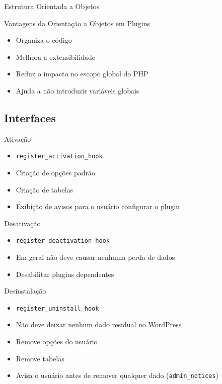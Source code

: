 \documentclass{beamer}
\begin{document}
\begin{frame}{Estrutura Orientada a Objetos}
  \pause 
\end{frame}

\begin{frame}{Vantagens da Orientação a Objetos em Plugins}
\begin{itemize}
  \pause \item Organiza o código
  \pause \item Melhora a extensibilidade
  \pause \item Reduz o impacto no escopo global do PHP
  \pause \item Ajuda a não introduzir variáveis globais
\end{itemize}
\end{frame}

\subsection{Interfaces}

\begin{frame}{Ativação}
\begin{itemize}
  \pause \item \texttt{register\_activation\_hook}
  \pause \item Criação de opções padrão
  \pause \item Criação de tabelas
  \pause \item Exibição de avisos para o usuário configurar o plugin
\end{itemize}
\end{frame}

\begin{frame}{Desativação}
\begin{itemize}
  \pause \item \texttt{register\_deactivation\_hook}
  \pause \item Em geral não deve causar nenhuma perda de dados
  \pause \item Desabilitar plugins dependentes
\end{itemize}
\end{frame}

\begin{frame}{Desinstalação}
\begin{itemize}
  \pause \item \texttt{register\_uninstall\_hook}
  \pause \item Não deve deixar nenhum dado residual no WordPress
  \pause \item Remove opções do usuário
  \pause \item Remove tabelas
  \pause \item Avisa o usuário antes de remover qualquer
    dado (\texttt{admin\_notices})
\end{itemize}
\end{frame}
\end{document}
